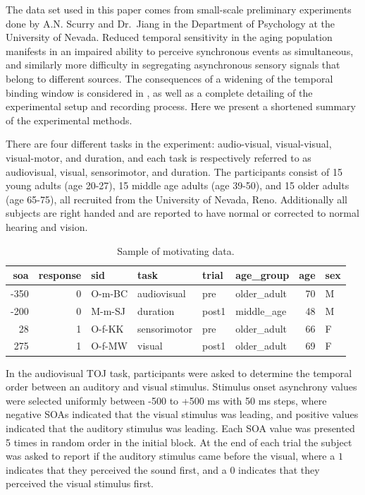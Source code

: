 \documentclass[11pt, oneside, openany]{scrbook}
\begin{document}
The data set used in this paper comes from small-scale preliminary experiments done by A.N. Scurry and Dr.~Jiang in the Department of Psychology at the University of Nevada. Reduced temporal sensitivity in the aging population manifests in an impaired ability to perceive synchronous events as simultaneous, and similarly more difficulty in segregating asynchronous sensory signals that belong to different sources. The consequences of a widening of the temporal binding window is considered in \citet{scurry2019aging}, as well as a complete detailing of the experimental setup and recording process. Here we present a shortened summary of the experimental methods.

There are four different tasks in the experiment: audio-visual, visual-visual, visual-motor, and duration, and each task is respectively referred to as audiovisual, visual, sensorimotor, and duration. The participants consist of 15 young adults (age 20-27), 15 middle age adults (age 39-50), and 15 older adults (age 65-75), all recruited from the University of Nevada, Reno. Additionally all subjects are right handed and are reported to have normal or corrected to normal hearing and vision.

\begin{table}[!h]

\caption{\label{tab:ch020-multitask-data}Sample of motivating data.}
\centering
\begin{tabular}[t]{rrllllrl}
\toprule
soa & response & sid & task & trial & age\_group & age & sex\\
\midrule
-350 & 0 & O-m-BC & audiovisual & pre & older\_adult & 70 & M\\
-200 & 0 & M-m-SJ & duration & post1 & middle\_age & 48 & M\\
28 & 1 & O-f-KK & sensorimotor & pre & older\_adult & 66 & F\\
275 & 1 & O-f-MW & visual & post1 & older\_adult & 69 & F\\
\bottomrule
\end{tabular}
\end{table}

In the audiovisual TOJ task, participants were asked to determine the temporal order between an auditory and visual stimulus. Stimulus onset asynchrony values were selected uniformly between -500 to +500 ms with 50 ms steps, where negative SOAs indicated that the visual stimulus was leading, and positive values indicated that the auditory stimulus was leading. Each SOA value was presented 5 times in random order in the initial block. At the end of each trial the subject was asked to report if the auditory stimulus came before the visual, where a \(1\) indicates that they perceived the sound first, and a \(0\) indicates that they perceived the visual stimulus first.
\end{document}
